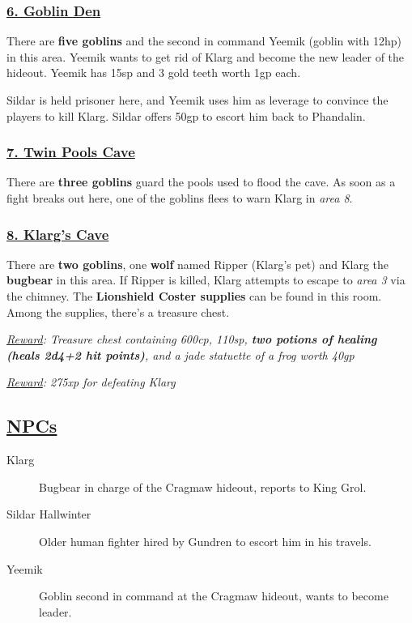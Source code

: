 \subsubsection*{\underline{6. Goblin Den}}
There are \textbf{five goblins} and the second in command Yeemik (goblin with 12hp) in this area. Yeemik wants to get rid of Klarg and become the new leader of the hideout. Yeemik has 15sp and 3 gold teeth worth 1gp each. 

Sildar is held prisoner here, and Yeemik uses him as leverage to convince the players to kill Klarg. Sildar offers 50gp to escort him back to Phandalin.

\subsubsection*{\underline{7. Twin Pools Cave}}
There are \textbf{three goblins} guard the pools used to flood the cave. As soon as a fight breaks out here, one of the goblins flees to warn Klarg in \emph{area 8}.

\subsubsection*{\underline{8. Klarg's Cave}}
There are \textbf{two goblins}, one \textbf{wolf} named Ripper (Klarg's pet) and Klarg the \textbf{bugbear} in this area. If Ripper is killed, Klarg attempts to escape to \emph{area 3} via the chimney. The \textbf{Lionshield Coster supplies} can be found in this room. Among the supplies, there's a treasure chest. 

\emph{\underline{Reward}: Treasure chest containing 600cp, 110sp, \textbf{two potions of healing (heals 2d4+2 hit points)}, and a jade statuette of a frog worth 40gp}

\emph{\underline{Reward}: 275xp for defeating Klarg} 


\subsection*{\underline{NPCs}}
\begin{description}
	\item[Klarg] Bugbear in charge of the Cragmaw hideout, reports to King Grol.
	\item[Sildar Hallwinter] Older human fighter hired by Gundren to escort him in his travels.
	\item[Yeemik] Goblin second in command at the Cragmaw hideout, wants to become leader.
\end{description}